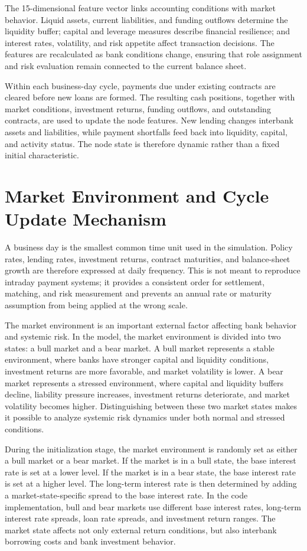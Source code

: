 The 15-dimensional feature vector links accounting conditions with
market behavior. Liquid assets, current liabilities, and funding
outflows determine the liquidity buffer; capital and leverage measures
describe financial resilience; and interest rates, volatility, and risk
appetite affect transaction decisions. The features are recalculated as
bank conditions change, ensuring that role assignment and risk
evaluation remain connected to the current balance sheet.

Within each business-day cycle, payments due under existing contracts
are cleared before new loans are formed. The resulting cash positions,
together with market conditions, investment returns, funding outflows,
and outstanding contracts, are used to update the node features. New
lending changes interbank assets and liabilities, while payment
shortfalls feed back into liquidity, capital, and activity status. The
node state is therefore dynamic rather than a fixed initial
characteristic.

\section{Market Environment and Cycle Update Mechanism}

A business day is the smallest common time unit used in the simulation.
Policy rates, lending rates, investment returns, contract maturities,
and balance-sheet growth are therefore expressed at daily frequency.
This is not meant to reproduce intraday payment systems; it provides a
consistent order for settlement, matching, and risk measurement and
prevents an annual rate or maturity assumption from being applied at the
wrong scale.

The market environment is an important external factor affecting bank
behavior and systemic risk. In the model, the market environment is
divided into two states: a bull market and a bear market. A bull market
represents a stable environment, where banks have stronger capital and
liquidity conditions, investment returns are more favorable, and market
volatility is lower. A bear market represents a stressed environment,
where capital and liquidity buffers decline, liability pressure
increases, investment returns deteriorate, and market volatility becomes
higher. Distinguishing between these two market states makes it possible
to analyze systemic risk dynamics under both normal and stressed
conditions.

During the initialization stage, the market environment is randomly set
as either a bull market or a bear market. If the market is in a bull
state, the base interest rate is set at a lower level. If the market is
in a bear state, the base interest rate is set at a higher level. The
long-term interest rate is then determined by adding a
market-state-specific spread to the base interest rate. In the code
implementation, bull and bear markets use different base interest rates,
long-term interest rate spreads, loan rate spreads, and investment
return ranges. The market state affects not only external return
conditions, but also interbank borrowing costs and bank investment
behavior.

